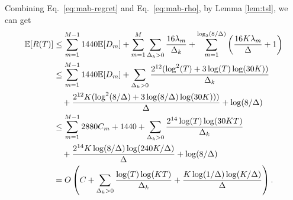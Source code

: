 Combining Eq.~\eqref{eq:mab-regret} and Eq.~\eqref{eq:mab-rho}, by Lemma \ref{lem:tsl}, we can get
\begin{equation*}
    \begin{split}
        {\mathbb{E}}[R(T)]
        &\leq \sum_{m=1}^{M-1} 1440 {\mathbb{E}}[D_m] + \sum_{m=1}^M \sum_{\Delta_k > 0}\frac{16\lambda_m}{\Delta_k} + \sum_{m=1}^{\log_2(8/\Delta)}\left(\frac{16K\lambda_m}{\Delta} + 1\right) \\
        &\leq \sum_{m=1}^{M-1} 1440 {\mathbb{E}}[D_m] + \sum_{\Delta_k > 0}\frac{2^{12}(\log^2(T) + 3\log(T)\log(30K))}{\Delta_k} \\
        &\quad + \frac{2^{12}K(\log^2(8/\Delta) + 3\log(8/\Delta)\log(30K)))}{\Delta} + \log(8/\Delta) \\
        &\leq \sum_{m=1}^{M-1} 2880 C_m + 1440 + \sum_{\Delta_k > 0}\frac{2^{14}\log(T)\log(30KT)}{\Delta_k} \\
        &\quad+ \frac{2^{14}K\log(8/\Delta)\log(240K / \Delta)}{\Delta}  + \log(8/\Delta)\\ 
        &= O\left(C + \sum_{\Delta_k > 0}\frac{\log(T)\log(KT)}{\Delta_k} + \frac{K\log(1/\Delta)\log(K / \Delta)}{\Delta}\right).
    \end{split}
\end{equation*}
